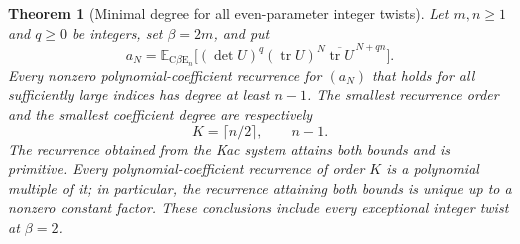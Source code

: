\documentclass[11pt,a4paper]{article}
\newtheorem{theorem}{Theorem}[section]
\theoremstyle{definition}
\theoremstyle{remark}
\numberwithin{equation}{section}
\begin{document}
\begin{theorem}[Minimal degree for all even-parameter integer twists]
\label{vtd:even-degree}
Let $m,n\ge1$ and $q\ge0$ be integers, set $\beta=2m$, and put
\[
 a_N=\mathbb E_{\mathrm C\beta\mathrm E_n}
       \bigl[(\det U)^q(\operatorname{tr}U)^N
                    \overline{\operatorname{tr}U}^{\,N+qn}\bigr].
\]
Every nonzero polynomial-coefficient recurrence for $(a_N)$ that holds
for all sufficiently large indices has degree at least $n-1$.
The smallest recurrence order and the smallest coefficient degree are
respectively
\[
                         K=\lceil n/2\rceil,\qquad n-1.
\]
The recurrence obtained from the Kac system attains both bounds and is
primitive.  Every polynomial-coefficient recurrence of order $K$ is a
polynomial multiple of it; in particular, the recurrence attaining
both bounds is unique up to a nonzero constant factor.
These conclusions include every exceptional integer twist at
$\beta=2$.
\end{theorem}
\end{document}
